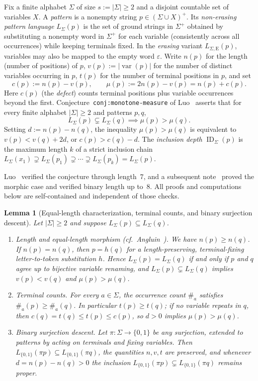 \documentclass[11pt]{article}
\theoremstyle{plain}
\newtheorem{lemma}[theorem]{Lemma}
\theoremstyle{definition}
\theoremstyle{remark}
\DeclareMathOperator{\ID}{ID}
\DeclareMathOperator{\var}{var}
\begin{document}
Fix a finite alphabet $\Sigma$ of size $s := |\Sigma| \ge 2$ and a disjoint countable set of variables $X$.
A \emph{pattern} is a nonempty string $p \in (\Sigma \cup X)^+$.
Its \emph{non-erasing pattern language} $L_\Sigma(p)$ is the set of ground strings in $\Sigma^+$ obtained by substituting a nonempty word in $\Sigma^+$ for each variable (consistently across all occurrences) while keeping terminals fixed.
In the \emph{erasing} variant $L_{\Sigma,\mathrm{E}}(p)$, variables may also be mapped to the empty word $\varepsilon$.
Write $n(p)$ for the length (number of positions) of $p$, $v(p) := |\var(p)|$ for the number of distinct variables occurring in $p$, $t(p)$ for the number of terminal positions in $p$, and set
\[
c(p) := n(p) - v(p), \qquad \mu(p) := 2n(p) - v(p) = n(p) + c(p).
\]
Here $c(p)$ (the \emph{defect}) counts terminal positions plus variable occurrences beyond the first.
Conjecture~\texttt{conj:monotone-measure} of Luo~\cite{Luo2026} asserts that for every finite alphabet $|\Sigma| \ge 2$ and patterns $p, q$,
\[
L_\Sigma(p) \subsetneq L_\Sigma(q) \implies \mu(p) > \mu(q).
\]
Setting $d := n(p) - n(q)$, the inequality $\mu(p) > \mu(q)$ is equivalent to $v(p) < v(q) + 2d$, or $c(p) > c(q) - d$.
The \emph{inclusion depth} $\ID_\Sigma(p)$ is the maximum length $k$ of a strict inclusion chain $L_\Sigma(x_1) \supsetneq L_\Sigma(p_1) \supsetneq \cdots \supsetneq L_\Sigma(p_k) = L_\Sigma(p)$.

Luo~\cite{Luo2026} verified the conjecture through length~$7$, and a subsequent note~\cite{IdeospherePatlang} proved the morphic case and verified binary length up to~$8$. All proofs and computations below are self-contained and independent of those checks.

\begin{lemma}[Equal-length characterization, terminal counts, and binary surjection descent]\label{lem:reductions}
Let $|\Sigma| \ge 2$ and suppose $L_\Sigma(p) \subseteq L_\Sigma(q)$.
\begin{enumerate}[label=\textup{(\arabic*)}]
\item \emph{Length and equal-length morphism \textup{(cf.\ Angluin~\cite{Angluin1980})}.} We have $n(p) \ge n(q)$. If $n(p) = n(q)$, then $p = h(q)$ for a length-preserving, terminal-fixing letter-to-token substitution $h$. Hence $L_\Sigma(p) = L_\Sigma(q)$ if and only if $p$ and $q$ agree up to bijective variable renaming, and $L_\Sigma(p) \subsetneq L_\Sigma(q)$ implies $v(p) < v(q)$ and $\mu(p) > \mu(q)$.
\item \emph{Terminal counts.} For every $a \in \Sigma$, the occurrence count $\#_a$ satisfies $\#_a(p) \ge \#_a(q)$. In particular $t(p) \ge t(q)$; if no variable repeats in $q$, then $c(q) = t(q) \le t(p) \le c(p)$, so $d > 0$ implies $\mu(p) > \mu(q)$.
\item \emph{Binary surjection descent.} Let $\pi \colon \Sigma \to \{0,1\}$ be any surjection, extended to patterns by acting on terminals and fixing variables. Then $L_{\{0,1\}}(\pi p) \subseteq L_{\{0,1\}}(\pi q)$, the quantities $n, v, t$ are preserved, and whenever $d = n(p) - n(q) > 0$ the inclusion $L_{\{0,1\}}(\pi p) \subsetneq L_{\{0,1\}}(\pi q)$ remains proper.
\end{enumerate}
\end{lemma}
\end{document}
